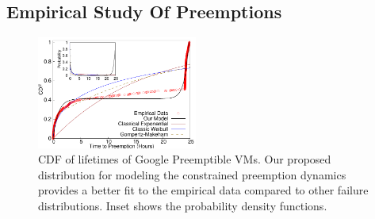 






\vspace*{\subsecspace}
\subsection{Empirical Study Of Preemptions}\label{sec:empirical}


\begin{figure}
  \includegraphics[width=0.47\textwidth]{../data/gnuplot-figures/sigmetrics-fig-cdf-prob-inset-time.pdf} 
  \caption{CDF of lifetimes of Google Preemptible VMs. Our proposed distribution for modeling the constrained preemption dynamics provides a better fit to the empirical data compared to other failure distributions. Inset shows the probability density functions.}
  \label{fig:gcp1}
\end{figure}


